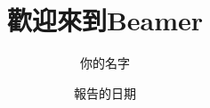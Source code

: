 \documentclass{beamer}
\title{歡迎來到Beamer}
\author{你的名字}
\institute{你來自哪個機構}
\date{報告的日期}
\begin{document}
\begin{frame}
\titlepage %
\end{frame}
\end{document}
